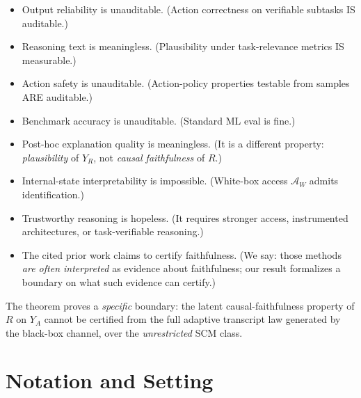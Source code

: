 \documentclass{article}
\theoremstyle{plain}
\theoremstyle{definition}
\theoremstyle{remark}
\begin{document}
\begin{itemize}
  \item Output reliability is unauditable. (Action correctness on verifiable subtasks IS auditable.)
  \item Reasoning text is meaningless. (Plausibility under task-relevance metrics IS measurable.)
  \item Action safety is unauditable. (Action-policy properties testable from samples ARE auditable.)
  \item Benchmark accuracy is unauditable. (Standard ML eval is fine.)
  \item Post-hoc explanation quality is meaningless. (It is a different property: \emph{plausibility} of $Y_R$, not \emph{causal faithfulness} of $R$.)
  \item Internal-state interpretability is impossible. (White-box access $\mathcal{A}_W$ admits identification.)
  \item Trustworthy reasoning is hopeless. (It requires stronger access, instrumented architectures, or task-verifiable reasoning.)
  \item The cited prior work claims to certify faithfulness. (We say: those methods \emph{are often interpreted} as evidence about faithfulness; our result formalizes a boundary on what such evidence can certify.)
\end{itemize}

The theorem proves a \emph{specific} boundary: the latent causal-faithfulness
property of $R$ on $Y_A$ cannot be certified from the full adaptive transcript
law generated by the black-box channel, over the \emph{unrestricted} SCM class.

\section{Notation and Setting}\label{sec:notss}
\end{document}
